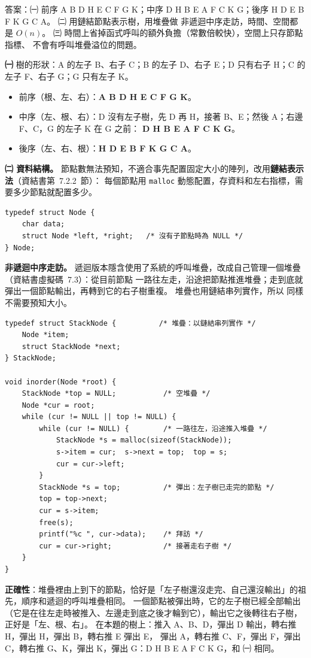 \begin{pastsoln}
答案：㈠ 前序 A B D H E C F G K；中序 D H B E A F C K G；後序 H D E B F K G C A。 ㈡ 用鏈結節點表示樹，用堆疊做
非遞迴中序走訪，時間、空間都是 $O(n)$。 ㈢ 時間上省掉函式呼叫的額外負擔（常數倍較快），空間上只存節點指標、
不會有呼叫堆疊溢位的問題。

\textbf{㈠} 樹的形狀：A 的左子 B、右子 C；B 的左子 D、右子 E；D 只有右子 H；C 的左子 F、右子 G；G 只有左子 K。
\begin{itemize}
\item 前序（根、左、右）：\textbf{A B D H E C F G K}。
\item 中序（左、根、右）：D 沒有左子樹，先 D 再 H，接著 B、E；然後 A；右邊 F、C，G 的左子 K 在 G 之前：
\textbf{D H B E A F C K G}。
\item 後序（左、右、根）：\textbf{H D E B F K G C A}。
\end{itemize}

\textbf{㈡ 資料結構。} 節點數無法預知，不適合事先配置固定大小的陣列，改用\textbf{鏈結表示法}（資結書第~7.2.2~節）：
每個節點用 \texttt{malloc} 動態配置，存資料和左右指標，需要多少節點就配置多少。
\begin{verbatim}
typedef struct Node {
    char data;
    struct Node *left, *right;   /* 沒有子節點時為 NULL */
} Node;
\end{verbatim}

\textbf{非遞迴中序走訪。} 遞迴版本隱含使用了系統的呼叫堆疊，改成自己管理一個堆疊（資結書虛擬碼~7.3）：從目前節點
一路往左走，沿途把節點推進堆疊；走到底就彈出一個節點輸出，再轉到它的右子樹重複。 堆疊也用鏈結串列實作，所以
同樣不需要預知大小。
\begin{verbatim}
typedef struct StackNode {          /* 堆疊：以鏈結串列實作 */
    Node *item;
    struct StackNode *next;
} StackNode;

void inorder(Node *root) {
    StackNode *top = NULL;           /* 空堆疊 */
    Node *cur = root;
    while (cur != NULL || top != NULL) {
        while (cur != NULL) {        /* 一路往左，沿途推入堆疊 */
            StackNode *s = malloc(sizeof(StackNode));
            s->item = cur;  s->next = top;  top = s;
            cur = cur->left;
        }
        StackNode *s = top;          /* 彈出：左子樹已走完的節點 */
        top = top->next;
        cur = s->item;
        free(s);
        printf("%c ", cur->data);    /* 拜訪 */
        cur = cur->right;            /* 接著走右子樹 */
    }
}
\end{verbatim}
\textbf{正確性}：堆疊裡由上到下的節點，恰好是「左子樹還沒走完、自己還沒輸出」的祖先，順序和遞迴的呼叫堆疊相同。
一個節點被彈出時，它的左子樹已經全部輸出（它是在往左走時被推入、左邊走到底之後才輪到它），輸出它之後轉往右子樹，
正好是「左、根、右」。 在本題的樹上：推入 A、B、D，彈出 D 輸出，轉右推 H，彈出 H，彈出 B，轉右推 E 彈出 E，
彈出 A，轉右推 C、F，彈出 F，彈出 C，轉右推 G、K，彈出 K，彈出 G：D H B E A F C K G，和 ㈠ 相同。


\end{pastsoln}
